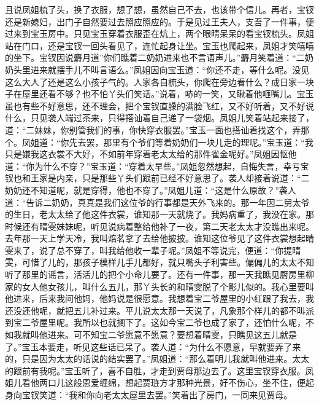 \begin{parag}
    且说凤姐梳了头，换了衣服，想了想，虽然自己不去，也该带个信儿。再者，宝钗还是新媳妇，出门子自然要过去照应照应的。于是见过王夫人，支吾了一件事，便过来到宝玉房中。只见宝玉穿着衣服歪在炕上，两个眼睛呆呆的看宝钗梳头。凤姐站在门口，还是宝钗一回头看见了，连忙起身让坐。宝玉也爬起来，凤姐才笑嘻嘻的坐下。宝钗因说麝月道”你们瞧着二奶奶进来也不言语声儿。”麝月笑着道：“二奶奶头里进来就摆手儿不叫言语么。”凤姐因向宝玉道：“你还不走，等什么呢。没见这么大人了还是这么小孩子气的。人家各自梳头，你爬在旁边看什么？成日家一块子在屋里还看不够？也不怕丫头们笑话。”说着，哧的一笑，又瞅着他咂嘴儿。宝玉虽也有些不好意思，还不理会，把个宝钗直臊的满脸飞红，又不好听着，又不好说什么，只见袭人端过茶来，只得搭讪着自己递了一袋烟。凤姐儿笑着站起来接了，道：“二妹妹，你别管我们的事，你快穿衣服罢。”宝玉一面也搭讪着找这个，弄那个。凤姐道：“你先去罢，那里有个爷们等着奶奶们一块儿走的理呢。”宝玉道：“我只是嫌我这衣裳不大好，不如前年穿着老太太给的那件雀金呢好。”凤姐因怄他道：“你为什么不穿？”宝玉道：“穿着太早些。”凤姐忽然想起，自悔失言，幸亏宝钗也和王家是内亲，只是那些丫头们跟前已经不好意思了。袭人却接着说道：“二奶奶还不知道呢，就是穿得，他也不穿了。”凤姐儿道：“这是什么原故？”袭人道：“告诉二奶奶，真真是我们这位爷的行事都是天外飞来的。那一年因二舅太爷的生日，老太太给了他这件衣裳，谁知那一天就烧了。我妈病重了，我没在家。那时候还有晴雯妹妹呢，听见说病着整给他补了一夜，第二天老太太才没瞧出来呢。去年那一天上学天冷，我叫焙茗拿了去给他披披。谁知这位爷见了这件衣裳想起晴雯来了，说了总不穿了，叫我给他收一辈子呢。”凤姐不等说完，便道：“你提晴雯，可惜了儿的，那孩子模样儿手儿都好，就只嘴头子利害些。偏偏儿的太太不知听了那里的谣言，活活儿的把个小命儿要了。还有一件事，那一天我瞧见厨房里柳家的女人他女孩儿，叫什么五儿，那丫头长的和晴雯脱了个影儿似的。我心里要叫他进来，后来我问他妈，他妈说是很愿意。我想着宝二爷屋里的小红跟了我去，我还没还他呢，就把五儿补过来。平儿说太太那一天说了，凡象那个样儿的都不叫派到宝二爷屋里呢。我所以也就搁下了。这如今宝二爷也成了家了，还怕什么呢，不如我就叫他进来。可不知宝二爷愿意不愿意？要想着晴雯，只瞧见这五儿就是了。”宝玉本要走，听见这些话已呆了。袭人道：“为什么不愿意，早就要弄了来的，只是因为太太的话说的结实罢了。”凤姐道：“那么着明儿我就叫他进来。太太的跟前有我呢。”宝玉听了，喜不自胜，才走到贾母那边去了。这里宝钗穿衣服。凤姐儿看他两口儿这般恩爱缠绵，想起贾琏方才那种光景，好不伤心，坐不住，便起身向宝钗笑道：“我和你向老太太屋里去罢。”笑着出了房门，一同来见贾母。
\end{parag}


